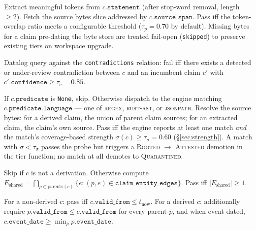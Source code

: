 \documentclass[10pt,a4paper]{article}
\begin{document}
\begin{description}[leftmargin=*,itemsep=2pt,topsep=3pt]
\item[P1 Provenance (\textsc{fatal}).] Extract meaningful tokens from
  $c.\texttt{statement}$ (after stop-word removal, length $\geq 2$). Fetch
  the source bytes slice addressed by $c.\texttt{source\_span}$. Pass iff
  the token-overlap ratio meets a configurable threshold
  ($\tau_{p}=0.70$ by default). Missing bytes for a claim pre-dating the
  byte store are treated fail-open (\texttt{skipped}) to preserve existing
  tiers on workspace upgrade.

\item[P2 Contradiction (\textsc{fatal}).] Datalog query against the
  \texttt{contradictions} relation: fail iff there exists a detected or
  under-review contradiction between $c$ and an incumbent claim
  $c'$ with $c'.\texttt{confidence} \geq \tau_{c} = 0.85$.

\item[P3 Predicate (\textsc{central}).] If $c.\texttt{predicate}$ is
  \texttt{None}, skip. Otherwise dispatch to the engine matching
  $c.\texttt{predicate.language}$ --- one of \textsc{regex},
  \textsc{rust-ast}, or \textsc{jsonpath}. Resolve the source bytes:
  for a derived claim, the union of parent claim sources; for an
  extracted claim, the claim's own source. Pass iff the engine reports
  at least one match \emph{and} the match's coverage-based strength
  $\sigma(c) \geq \tau_{\sigma} = 0.60$ (§\ref{sec:strength}). A match
  with $\sigma < \tau_{\sigma}$ passes the probe but triggers a
  \textsc{Rooted} $\to$ \textsc{Attested} demotion in the tier function;
  no match at all demotes to \textsc{Quarantined}.

\item[P4 Topology (\textsc{non-fatal}).] Skip if $c$ is not a derivation.
  Otherwise compute
  $E_{\text{shared}} = \bigcap_{p \in \text{parents}(c)} \{e : (p, e) \in
  \texttt{claim\_entity\_edges}\}$.
  Pass iff $|E_{\text{shared}}| \geq 1$.

\item[P5 Temporal (\textsc{non-fatal}).] For a non-derived $c$: pass iff
  $c.\texttt{valid\_from} \leq t_{\text{now}}$. For a derived $c$:
  additionally require $p.\texttt{valid\_from} \leq c.\texttt{valid\_from}$
  for every parent $p$, and when event-dated,
  $c.\texttt{event\_date} \geq \min_p p.\texttt{event\_date}$.
\end{description}
\end{document}
